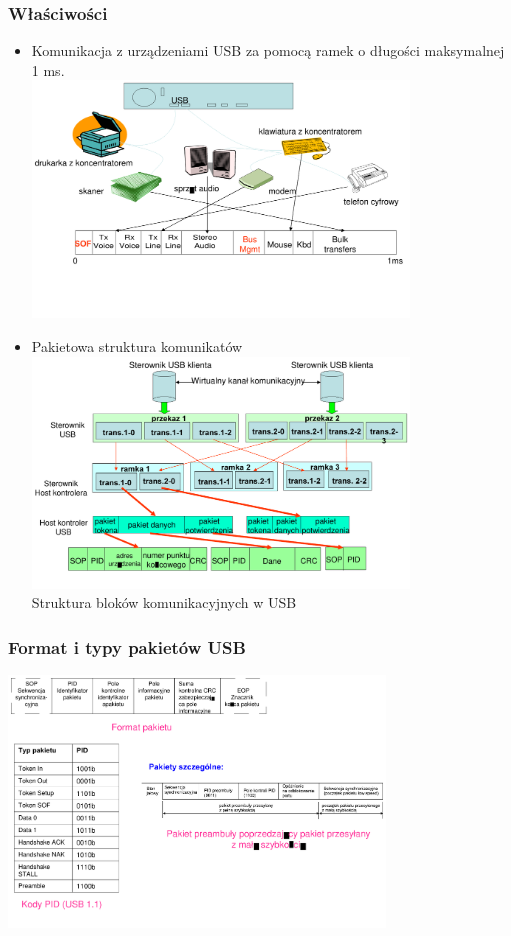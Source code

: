 \documentclass[a4paper,twoside]{article}
\begin{document}
	\subsubsection{Właściwości}
	\begin{itemize}
		\item Komunikacja z urządzeniami USB za pomocą ramek o długości maksymalnej 1 ms.\\
		\includegraphics[width=10cm]{./wyklady/USB_18_1.pdf}
		\item Pakietowa struktura komunikatów\\
		\includegraphics[width=10cm]{./wyklady/USB_19_1.pdf}\\
		Struktura bloków komunikacyjnych w USB
	\end{itemize}
	\subsubsection{Format i typy pakietów USB}
	\includegraphics[width=10cm]{./wyklady/USB_20_1.pdf}
\end{document}
